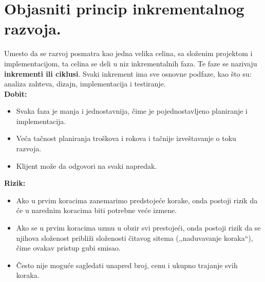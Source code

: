 \documentclass[a4paper]{article}
\begin{document}
\section{Objasniti princip inkrementalnog razvoja.}
  Umesto da se razvoj posmatra kao jedna velika celina, sa složenim projektom i implementacijom,
  ta celina se deli u niz inkrementalnih faza. Te faze se nazivaju \textbf{inkrementi ili ciklusi}. 
  Svaki inkrement ima sve osnovne podfaze, kao što su: analiza zahteva, dizajn, 
  implementacija i testiranje. \cite{guru99_incremental_model}\\
  \textbf{Dobit:}
  \begin{itemize}
    \item Svaka faza je manja i jednostavnija, čime je pojednostavljeno planiranje i implementacija.
    \item Veća tačnost planiranja troškova i rokova i tačnije izveštavanje o toku razvoja.
    \item Klijent može da odgovori na svaki napredak.
  \end{itemize}
  \textbf{Rizik:}
  \begin{itemize}
    \item Ako u prvim koracima zanemarimo predstojeće korake, onda postoji rizik da će
          u narednim koracima biti potrebne veće izmene.
    \item Ako se u prvim koracima uzmu u obzir svi prestojeći, onda postoji rizik da se 
          njihova složenost približi složenosti čitavog sitema (,,naduvavanje koraka``), 
          čime ovakav pristup gubi smisao.
    \item Često nije moguće sagledati unapred broj, cenu i ukupno trajanje svih koraka.
  \end{itemize}
\end{document}
